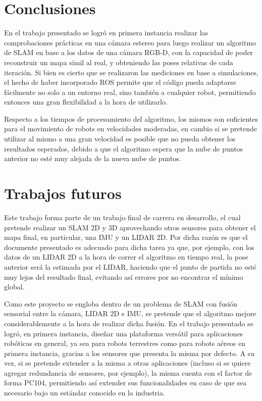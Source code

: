 \section{Conclusiones}
\label{sec:5_concl}
\ifimagenes
En el trabajo presentado se logró en primera instancia realizar las comprobaciones prácticas en una cámara estereo para luego realizar un algoritmo de SLAM en base a los datos de una cámara RGB-D, con la capacidad de poder reconstruir un mapa símil al real, y obteniendo las poses relativas de cada iteración. Si bien es cierto que se realizaron las mediciones en base a simulaciones, el hecho de haber incorporado ROS permite que el código pueda adaptarse fácilmente no solo a un entorno real, sino también a cualquier robot, permitiendo entonces una gran flexibilidad a la hora de utilizarlo. 

Respecto a los tiempos de procesamiento del algoritmo, los mismos son suficientes para el movimiento de robots en velocidades moderadas, en cambio si se pretende utilizar al mismo a una gran velocidad es posible que no pueda obtener los resultados esperados, debido a que el algoritmo espera que la nube de puntos anterior no esté muy alejada de la nueva nube de puntos. 

\section{Trabajos futuros}
Este trabajo forma parte de un trabajo final de carrera en desarrollo, el cual pretende realizar un SLAM 2D y 3D aprovechando otros sensores para obtener el mapa final, en particular, una IMU y un LIDAR 2D. Por dicha razón es que el documente presentado es adecuado para dicha tarea ya que, por ejemplo, con los datos de un LIDAR 2D a la hora de correr el algoritmo en tiempo real, la pose anterior será la estimada por el LIDAR, haciendo que el punto de partida no esté muy lejos del resultado final, evitando así errores por no encontrar el mínimo global.

Como este proyecto se engloba dentro de un problema de SLAM con fusión sensorial entre la cámara, LIDAR 2D e IMU, se pretende que el algoritmo mejore considerablemente a la hora de realizar dicha fusión.
\else
En el trabajo presentado se logró, en primera instancia, diseñar una plataforma versátil para aplicaciones robóticas en general, ya sea para robots terrestres como para robots aéreos en primera instancia, gracias a los sensores que presenta la misma por defecto. A su vez, si se pretende extender a la misma a otras aplicaciones (incluso si se quiere agregar redundancia de sensores, por ejemplo), la misma cuenta con el factor de forma PC104, permitiendo así extender sus funcionalidades en caso de que sea necesario bajo un estándar conocido en la industria.

